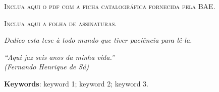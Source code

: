 \imprimircapa


\setcounter{page}{3}
\imprimirfolhaderosto*


\begin{fichacatalografica}
    \vspace*{\fill}
    \begin{center}
        \textsc{Inclua aqui o pdf com a ficha catalográfica fornecida pela BAE.}
    \end{center}
    \vspace*{\fill}
\end{fichacatalografica}


\newpage
\vspace*{\fill}
\begin{center}
    \textsc{Inclua aqui a folha de assinaturas.}
\end{center}
\vspace*{\fill}
\newpage
%
\cleardoublepage


\begin{dedicatoria}
    \vspace*{\fill}
    \centering
    \noindent
    \textit{Dedico esta tese à todo mundo que tiver paciência para lê-la.}
    \vspace*{\fill}
\end{dedicatoria}

\begin{agradecimentos}
    
\end{agradecimentos}

\begin{epigrafe}
    \vspace*{\fill}
    \begin{flushright}
        \textit{``Aqui jaz seis anos da minha vida.''\\
        (Fernando Henrique de Sá)}
    \end{flushright}
\end{epigrafe}

\begin{resumo}
    
    \vspace{\onelineskip}
    \noindent\textbf{Keywords}: keyword 1; keyword 2; keyword 3.
    \vspace{\fill}
\end{resumo}

